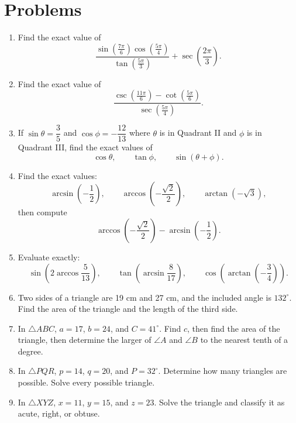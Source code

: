 \documentclass[12pt]{article}
\begin{document}
\section*{Problems}
\begin{enumerate}[leftmargin=*, itemsep=1em, topsep=0.8em]
  \item Find the exact value of
  \[
  \frac{\sin\left(\frac{7\pi}{6}\right)\cos\left(\frac{5\pi}{4}\right)}{\tan\left(\frac{5\pi}{3}\right)}
  +\sec\left(\frac{2\pi}{3}\right).
  \]

  \item Find the exact value of
  \[
  \frac{\csc\left(\frac{11\pi}{6}\right)-\cot\left(\frac{5\pi}{6}\right)}{\sec\left(\frac{5\pi}{4}\right)}.
  \]

  \item If $\sin\theta=\dfrac{3}{5}$ and $\cos\phi=-\dfrac{12}{13}$ where $\theta$ is in Quadrant II and $\phi$ is in Quadrant III, find the exact values of
  \[
  \cos\theta,\qquad \tan\phi,\qquad \sin(\theta+\phi).
  \]

  \item Find the exact values:
  \[
  \arcsin\left(-\frac{1}{2}\right),\qquad
  \arccos\left(-\frac{\sqrt{2}}{2}\right),\qquad
  \arctan(-\sqrt{3}),
  \]
  then compute
  \[
  \arccos\left(-\frac{\sqrt{2}}{2}\right)-\arcsin\left(-\frac{1}{2}\right).
  \]

  \item Evaluate exactly:
  \[
  \sin\!\left(2\arccos\frac{5}{13}\right),\qquad
  \tan\!\left(\arcsin\frac{8}{17}\right),\qquad
  \cos\!\left(\arctan\left(-\frac{3}{4}\right)\right).
  \]

  \item Two sides of a triangle are 19 cm and 27 cm, and the included angle is $132^\circ$. Find the area of the triangle and the length of the third side.

  \item In $\triangle ABC$, $a=17$, $b=24$, and $C=41^\circ$. Find $c$, then find the area of the triangle, then determine the larger of $\angle A$ and $\angle B$ to the nearest tenth of a degree.

  \item In $\triangle PQR$, $p=14$, $q=20$, and $P=32^\circ$. Determine how many triangles are possible. Solve every possible triangle.

  \item In $\triangle XYZ$, $x=11$, $y=15$, and $z=23$. Solve the triangle and classify it as acute, right, or obtuse.


\end{enumerate}
\end{document}
